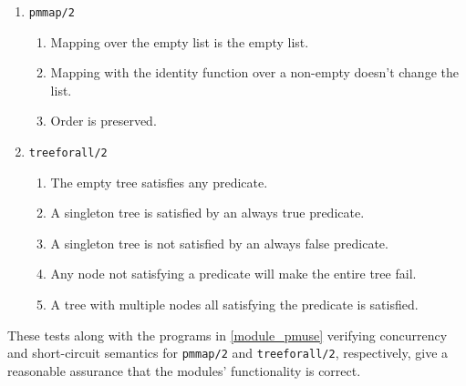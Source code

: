 \begin{enumerate}
\begin{enumerate}
        \item \texttt{pmmap/2}
        \begin{enumerate}
            \item Mapping over the empty list is the empty list.
            \item Mapping with the identity function over a non-empty doesn't change the list.
            \item Order is preserved.
        \end{enumerate}
        \item \texttt{treeforall/2}
        \begin{enumerate}
            \item The empty tree satisfies any predicate.
            \item A singleton tree is satisfied by an always true predicate.
            \item A singleton tree is not satisfied by an always false predicate.
            \item Any node not satisfying a predicate will make the entire tree fail.
            \item A tree with multiple nodes all satisfying the predicate is satisfied.
        \end{enumerate}
    \end{enumerate}
\end{enumerate}

These tests along with the programs in \autoref{module_pmuse} verifying
concurrency and short-circuit semantics for \verb|pmmap/2| and
\verb|treeforall/2|, respectively, give a reasonable assurance that the
modules' functionality is correct.
